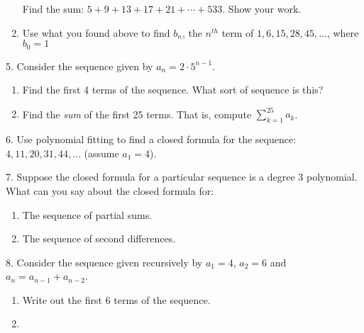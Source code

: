 \documentclass[10pt,]{book}
\theoremstyle{plain}
\theoremstyle{definition}
\theoremstyle{definition}
\theoremstyle{definition}
\numberwithin{equation}{chapter}
\def\d{\displaystyle}
\begin{document}
\begin{exerciselist}
\begin{enumerate}[label=(\alph*)]
                Find the sum: \(5 + 9 + 13 + 17 + 21 + \cdots + 533\). Show your work.
\item\hypertarget{li-970}{}
                Use what you found above to find \(b_n\), the \(n^{th}\) term of \(1, 6, 15, 28, 45, \ldots\), where \(b_0 = 1\)
\end{enumerate}
\par\smallskip
\item[5.]\hypertarget{exercise-192}{}
            Consider the sequence given by \(a_n = 2\cdot 5^{n-1}\).
\leavevmode%
\begin{enumerate}[label=(\alph*)]
\item\hypertarget{li-977}{}
                Find the first 4 terms of the sequence. What sort of sequence is this?
\item\hypertarget{li-978}{}
                Find the \emph{sum} of the first 25 terms. That is, compute \(\d\sum_{k=1}^{25}a_k\).
\end{enumerate}
\par\smallskip
\item[6.]\hypertarget{exercise-193}{}
            Use polynomial fitting to find a closed formula for the sequence:
            \(4, 11, 20, 31, 44, \ldots\) (assume \(a_1 = 4\)).
\par\smallskip
\item[7.]\hypertarget{exercise-194}{}
            Suppose the closed formula for a particular sequence is a degree 3 polynomial. What can you say about the closed formula for:
\leavevmode%
\begin{enumerate}[label=(\alph*)]
\item\hypertarget{li-981}{}
                The sequence of partial sums.
\item\hypertarget{li-982}{}
                The sequence of second differences.
\end{enumerate}
\par\smallskip
\item[8.]\hypertarget{exercise-195}{}
            Consider the sequence given recursively by \(a_1 = 4\), \(a_2 = 6\) and \(a_n = a_{n-1} + a_{n-2}\).
\leavevmode%
\begin{enumerate}[label=(\alph*)]
\item\hypertarget{li-985}{}
                Write out the first 6 terms of the sequence.
\item\hypertarget{li-986}{}

\end{enumerate}
\end{exerciselist}
\end{document}
